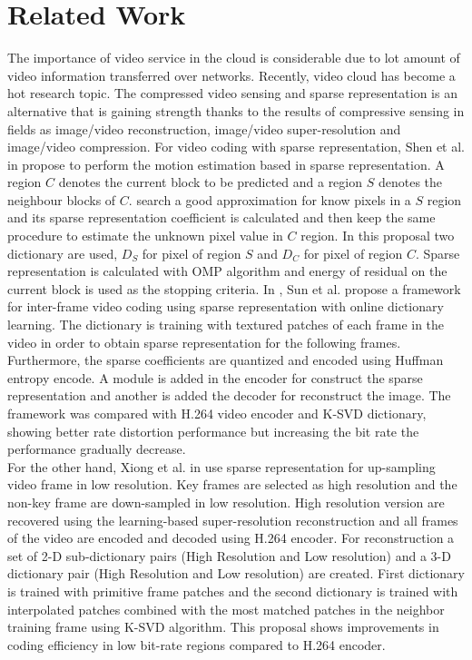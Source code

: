 \chapter{Related Work}

The importance of video service in the cloud is considerable due to lot amount of video information transferred over networks. Recently, video cloud has become a hot research topic. The compressed video sensing and sparse representation is an alternative that is gaining strength thanks to the results of compressive sensing in fields as image/video reconstruction, image/video super-resolution and image/video compression. For video coding with sparse representation, Shen et al. in \cite{motion_cs} propose to perform the motion estimation based in sparse representation. A region $C$ denotes the current block to  be predicted and a region $S$ denotes the neighbour blocks of $C$.  search a good approximation for know pixels in a $S$ region and its sparse representation coefficient is calculated and then keep the same procedure to estimate the unknown pixel value in $C$ region. In this proposal two dictionary are used, $D_S$ for pixel of region $S$ and $D_C$ for pixel of region $C$. Sparse representation is calculated with OMP algorithm and energy of residual on the current block is used as the stopping criteria. In \cite{odl_me}, Sun et al. propose a framework for inter-frame video coding using sparse representation with online dictionary learning. The dictionary is training with textured patches of each frame in the video in order to obtain sparse representation for the following frames. Furthermore, the sparse coefficients are quantized and encoded using Huffman entropy encode. A module is added in the encoder for construct the sparse representation and another is added the decoder for reconstruct the image. The framework was compared with H.264 video encoder and  K-SVD dictionary, showing better rate distortion performance but increasing the bit rate the performance gradually decrease. \\

For the other hand, Xiong et al. in \cite{sparse_st, 6189245} use sparse representation for up-sampling video frame in low resolution. Key frames are selected as high resolution and the non-key frame are down-sampled in low resolution. High resolution version are recovered  using the learning-based super-resolution reconstruction and all frames of the video are encoded and decoded using H.264 encoder. For reconstruction a set of 2-D sub-dictionary pairs (High Resolution and Low resolution) and a 3-D dictionary pair (High Resolution and Low resolution) are created. First dictionary is trained with primitive frame patches and the second dictionary is trained with interpolated patches combined with the most matched patches in the neighbor training frame using K-SVD algorithm. This proposal shows improvements in coding efficiency in low bit-rate regions compared to H.264 encoder.\\

